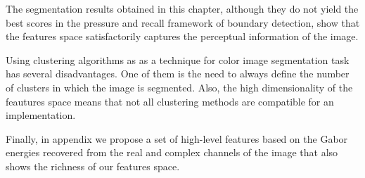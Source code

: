 The segmentation results obtained in this chapter, although they do not yield the best scores in the pressure and recall framework of boundary detection, show that the features space satisfactorily captures the perceptual information of the image.

Using clustering algorithms as as a technique for color image segmentation task has several disadvantages. One of them is the need to always define the number of clusters in which the image is segmented. Also, the high dimensionality of the feautures space means that not all clustering methods are compatible for an implementation. 

Finally, in appendix we propose a set of high-level features based on the Gabor energies recovered from the real and complex channels of the image that also shows the richness of our features space.

